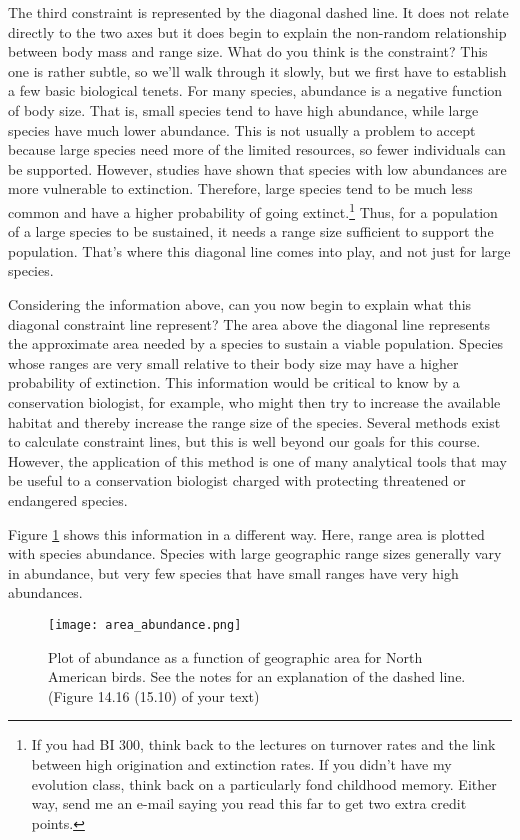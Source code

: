 \documentclass[11pt, hidelinks]{article}
\begin{document}
The third constraint is represented by the diagonal dashed line.  It does not relate directly to the two axes but it does begin to explain the non-random relationship between body mass and range size. What do you think is the constraint? This one is rather subtle, so we'll walk through it slowly, but we first have to establish a few basic biological tenets.  For many species, abundance is a negative function of body size.  That is, small species tend to have high abundance, while large species have much lower abundance.  This is not usually a problem to accept because large species need more of the limited resources, so fewer individuals can be supported.  However, studies have shown that species with low abundances are more vulnerable to extinction.  Therefore, large species tend to be much less common and have a higher probability of going extinct.\footnote{If you had BI 300, think back to the lectures on turnover rates and the link between high origination and extinction rates.  If you didn't have my evolution class, think back on a particularly fond childhood memory.  Either way, send me an e-mail saying you read this far to get two extra credit points.}  Thus, for a population of a large species to be sustained, it needs a range size sufficient to support the population.  That's where this diagonal line comes into play, and not just for large species. 
 
Considering the information above, can you now begin to explain what this diagonal constraint line represent?  The area above the diagonal line represents the approximate area needed by a species to sustain a viable population.  Species whose ranges are very small relative to their body size may have a higher probability of extinction.  This information would be critical to know by a conservation biologist, for example, who might then try to increase the available habitat and thereby increase the range size of the species.  Several methods exist to calculate constraint lines, but this is well beyond our goals for this course.  However, the application of this method is one of many analytical tools that may be useful to a conservation biologist charged with protecting threatened or endangered species.

Figure \ref{area and abundance} shows this information in a different way.  Here, range area is plotted with species abundance.  Species with large geographic range sizes generally vary in abundance, but very few species that have small ranges have very high abundances.

\begin{figure}[tb]
	\centering
		\texttt{[image: area\_abundance.png]}  
		\caption{Plot of abundance as a function of geographic area for North American birds.  See the notes for an explanation of the dashed line. (Figure 14.16 (15.10) of your text) \label{area and abundance}}
\end{figure}
\end{document}
